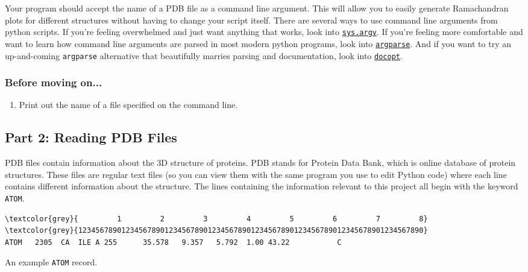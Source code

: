 \documentclass{article}
\newcommand{\module}[2]{\href{#2}{\texttt{#1}}}
\newcommand{\atomrec}{\texttt{ATOM} record}
\newenvironment{problems}
{\subsubsection{Before moving on...} \begin{enumerate}}
{\end{enumerate}}
\begin{document}
Your program should accept the name of a PDB file as a command line argument.  
This will allow you to easily generate Ramachandran plots for different 
structures without having to change your script itself.  There are several ways 
to use command line arguments from python scripts.  If you're feeling 
overwhelmed and just want anything that works, look into 
\module{sys.argv}{http://learnpythonthehardway.org/book/ex13.html}.  If you're 
feeling more comfortable and want to learn how command line arguments are 
parsed in most modern python programs, look into 
\module{argparse}{https://docs.python.org/2.7/howto/argparse.html}.  And if you 
want to try an up-and-coming \texttt{argparse} alternative that beautifully 
marries parsing and documentation, look into 
\module{docopt}{https://github.com/docopt/docopt}.

\begin{problems}
\item Print out the name of a file specified on the command line.
\end{problems}

\subsection{Part 2: Reading PDB Files}

PDB files contain information about the 3D structure of proteins.  PDB stands 
for Protein Data Bank, which is online database of protein structures.  These  
files are regular text files (so you can view them with the same program you 
use to edit Python code) where each line contains different information about 
the structure.  The lines containing the information relevant to this project 
all begin with the keyword \texttt{ATOM}.  

\begin{listing}[h]
\centering
\begin{BVerbatim}[fontsize=\footnotesize,commandchars=\\\{\}]
\textcolor{grey}{         1         2         3         4         5         6         7         8}
\textcolor{grey}{12345678901234567890123456789012345678901234567890123456789012345678901234567890}
ATOM   2305  CA  ILE A 255      35.578   9.357   5.792  1.00 43.22           C  
\end{BVerbatim}
\caption{An example \atomrec{}.}
\label{list:pdb-example}
\end{listing}
\end{document}
